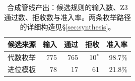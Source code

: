\begin{table}[t]
\centering
\caption{合成管线产出：候选规则的输入数、Z3 通过数、拒收数与准入率。两条枚举路径的详细构造见§\ref{sec:synthesis}。}
\label{tab:synth-alive2}
\footnotesize
\begin{tabular}{@{}lrrrr@{}}
\toprule
候选来源 & 输入 & 通过 & 拒收 & 准入率 \\
\midrule
代数枚举   & 775 & 765 & 10$^*$                & 98.7\% \\
进位模板   &  78 &  17 & 61\phantom{$^*$}      & 21.8\% \\
\bottomrule
\end{tabular}
\vspace{2pt}
\par{}
\end{table}
